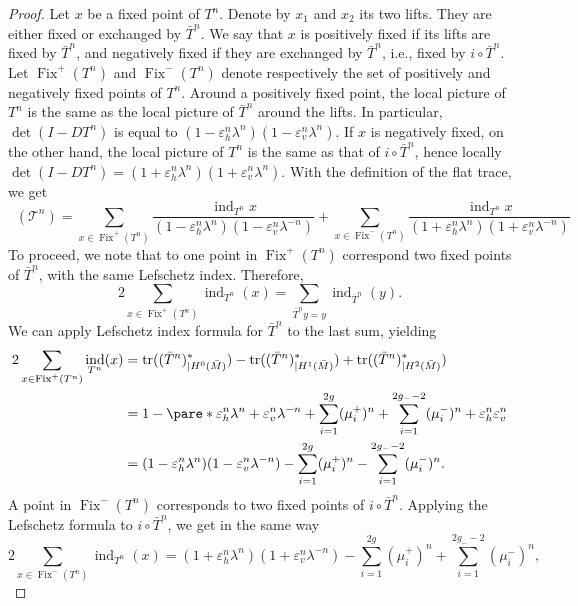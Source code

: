 \documentclass[11pt, a4paper, oneside, final, pagebackref]{amsart}
\newcommand{\boT}{\mathcal{T}}
\newcommand{\restr}{|}
\DeclareMathOperator{\ind}{ind}
\DeclareMathOperator{\Fix}{Fix}
\DeclareMathOperator{\flattr}{\mathrm{tr}^{\flat}}
\DeclareMathOperator{\tr}{tr}
\renewcommand{\epsilon}{\varepsilon}
\theoremstyle{definition}
\numberwithin{equation}{section}
\begin{document}
\begin{proof}
Let $x$ be a fixed point of $T^n$. Denote by $x_1$ and $x_2$ its two lifts.
They are either fixed or exchanged by $\bar T^n$. We say that $x$ is
positively fixed if its lifts are fixed by $\bar T^n$, and negatively fixed
if they are exchanged by $\bar T^n$, i.e., fixed by $i \circ \bar T^n$. Let
$\Fix^+(T^n)$ and $\Fix^-(T^n)$ denote respectively the set of positively and
negatively fixed points of $T^n$. Around a positively fixed point, the local
picture of $T^n$ is the same as the local picture of $\bar T^n$ around the
lifts. In particular, $\det(I-DT^n)$ is equal to $(1-\epsilon_h^n \lambda^n)
(1-\epsilon_v^n \lambda^n)$. If $x$ is negatively fixed, on the other hand,
the local picture of $T^n$ is the same as that of $i \circ \bar T^n$, hence
locally $\det(I-DT^n) = (1+\epsilon_h^n \lambda^n) (1+\epsilon_v^n
\lambda^n)$. With the definition of the flat trace, we get
\begin{equation}
\label{eq:wcvlmijmkljwxcvwcx}
  \flattr(\boT^n) =
  \sum_{x \in \Fix^+(T^n)} \frac{ \ind_{T^n} x}{(1-\epsilon_h^n \lambda^n) (1-\epsilon_v^n \lambda^{-n})}
  + \sum_{x \in \Fix^-(T^n)} \frac{ \ind_{T^n} x}{(1+\epsilon_h^n \lambda^n) (1+\epsilon_v^n \lambda^{-n})}
\end{equation}
To proceed, we note that to one point in $\Fix^+(T^n)$ correspond two fixed
points of $\bar T^n$, with the same Lefschetz index. Therefore,
\begin{equation*}
  2\sum_{x \in \Fix^+(T^n)} \ind_{T^n}(x) = \sum_{\bar T^n y = y} \ind_{\bar T^n}(y).
\end{equation*}
We can apply Lefschetz index formula for $\bar T^n$ to the last sum, yielding
\begin{align*}
  2\sum_{x \in \Fix^+(T^n)} \ind_{T^n}(x) & = \tr((\bar T^n)_{\restr H^0(\bar M)}^*) - \tr((\bar T^n)_{\restr H^1(\bar M)}^*) + \tr((\bar T^n)_{\restr H^2(\bar M)}^*)
  \\& = 1 - \pare*{\epsilon_h^n \lambda^n + \epsilon_v^n \lambda^{-n} + \sum_{i=1}^{2g} (\mu_i^+)^n + \sum_{i=1}^{2g_--2} (\mu_i^-)^n } + \epsilon_h^n \epsilon_v^n
  \\& = (1-\epsilon_h^n \lambda^n) (1-\epsilon_v^n \lambda^{-n}) - \sum_{i=1}^{2g} (\mu_i^+)^n - \sum_{i=1}^{2g_--2} (\mu_i^-)^n.
\end{align*}
A point in $\Fix^-(T^n)$ corresponds to two fixed points of $i \circ \bar
T^n$. Applying the Lefschetz formula to $i\circ \bar T^n$, we get in the same
way
\begin{equation*}
  2\sum_{x \in \Fix^-(T^n)} \ind_{T^n}(x) = (1+\epsilon_h^n \lambda^n) (1+\epsilon_v^n \lambda^{-n}) - \sum_{i=1}^{2g} (\mu_i^+)^n + \sum_{i=1}^{2g_--2} (\mu_i^-)^n,

\end{equation*}
\end{proof}
\end{document}
